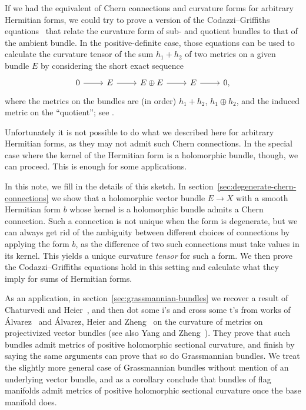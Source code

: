 \documentclass[10pt,a4paper]{amsart}
\theoremstyle{definition}
\begin{document}
If we had the equivalent of Chern connections and curvature forms for arbitrary Hermitian forms, we could try to prove a version of the Codazzi--Griffiths equations~\cite{griffiths1965hermitian} that relate the curvature form of sub- and quotient bundles to that of the ambient bundle. In the positive-definite case, those equations can be used to calculate the curvature tensor of the sum $h_1 + h_2$ of two metrics on a given bundle $E$ by considering the short exact sequence
\[
\begin{tikzcd}
0 \ar[r] & E \ar[r] & E\oplus E \ar[r] &  E \ar[r] & 0,
\end{tikzcd}
\]
where the metrics on the bundles are (in order) $h_1 + h_2$, $h_1 \oplus h_2$,
and the induced metric on the ``quotient''; see \cite[Chapter~7,
Exercise~6]{zheng2000complex}.

Unfortunately it is not possible to do what we described here for arbitrary
Hermitian forms, as they may not admit such Chern connections.
In the special case where the kernel of the Hermitian form is a holomorphic
bundle, though, we can proceed.
This is enough for some applications.

In this note, we fill in the details of this sketch. In
section~\ref{sec:degenerate-chern-connections} we show that a holomorphic
vector bundle $E \to X$ with a smooth Hermitian form $b$ whose kernel
is a holomorphic bundle admits a Chern
connection. Such a connection is not unique when the form is degenerate, but we
can always get rid of the ambiguity between different choices of connections by
applying the form $b$, as the difference of two such connections must take
values in its kernel. This yields a unique curvature \emph{tensor} for such a
form. We then prove the Codazzi--Griffiths equations hold in this setting and
calculate what they imply for sums of Hermitian forms.

As an application, in section~\ref{sec:grassmannian-bundles} we
recover a result of Chaturvedi and Heier~\cite{chaturvedi2020hermitian}, and
then dot some i's and cross some t's from works of
\'Alvarez~\cite{alvarez2016positive} and \'Alvarez, Heier and
Zheng~\cite{alvarez2018projectivized} on the curvature of metrics on
projectivized vector bundles (see also Yang and
Zheng~\cite{yang2019hirzebruch}). They prove that such bundles admit metrics of
positive holomorphic sectional curvature, and finish by saying the same
arguments can prove that so do Grassmannian bundles. We treat the slightly more
general case of Grassmannian bundles without mention of an underlying vector
bundle, and as a corollary conclude that bundles of flag manifolds admit
metrics of positive holomorphic sectional curvature once the base manifold
does.
\end{document}
